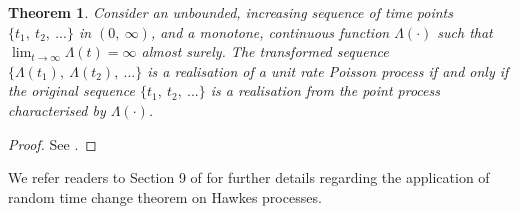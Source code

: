 \documentclass[11pt,a4paper]{article}
\numberwithin{equation}{section}
\newtheorem{theorem}{Theorem}[section]
\theoremstyle{remark}
\theoremstyle{definition}
\begin{document}
\begin{theorem}
Consider an unbounded, increasing sequence of time points $\{t_1,\ t_2,\ ...\}$ in $(0,\ \infty)$, and a monotone, continuous function
$\Lambda(\cdot)$ such that $\lim_{t \rightarrow \infty}\Lambda(t)=\infty$ almost surely.
The transformed sequence $\{\Lambda(t_1),\ \Lambda(t_2),\ ...\}$ is a realisation of a unit rate Poisson process if and only if the original sequence $\{t_1,\ t_2,\ ...\}$
is a realisation from the point process characterised by $\Lambda(\cdot)$.
\end{theorem}

\begin{proof}
  See \cite{brown1988simple}.
\end{proof}
We refer readers to Section 9 of \cite{laub2021elements} for further details regarding the application of random time change theorem on Hawkes processes.
\end{document}
